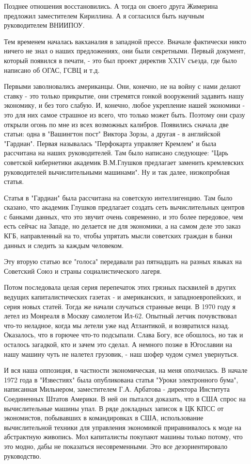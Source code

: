 \documentclass{article}
\begin{document}
Позднее отношения восстановились. А тогда он своего друга Жимерина предложил
заместителем Кириллина. А я согласился быть научным руководителем ВНИИПОУ.

Тем временем началась вакханалия в западной прессе. Вначале фактически никто
ничего не знал о наших предложениях, они были секретными. Первый документ,
который появился в печати, - это был проект директив XXIV съезда, где было
написано об ОГАС, ГСВЦ и т.д.

Первыми заволновались американцы. Они, конечно, не на войну с нами делают ставку
- это только прикрытие, они стремятся гонкой вооружений задавить нашу экономику,
и без того слабую. И, конечно, любое укрепление нашей экономики - это для них
самое страшное из всего, что только может быть. Поэтому они сразу открыли огонь
по мне из всех возможных калибров. Появились сначала две статьи: одна в
"Вашингтон пост" Виктора Зорзы, а другая - в английской "Гардиан". Первая
называлась "Перфокарта управляет Кремлем" и была рассчитана на наших
руководителей. Там было написано следующее: "Царь советской кибернетики академик
В.М.Глушков предлагает заменить кремлевских руководителей вычислительными
машинами". Ну и так далее, низкопробная статья.

Статья в "Гардиан" была рассчитана на советскую интеллигенцию. Там было сказано,
что академик Глушков предлагает создать сеть вычислительных центров с банками
данных, что это звучит очень современно, и это более передовое, чем есть сейчас
на Западе, но делается не для экономики, а на самом деле это заказ КГБ,
направленный на то, чтобы упрятать мысли советских граждан в банки данных и
следить за каждым человеком.

Эту вторую статью все "голоса" передавали раз пятнадцать на разных языках на
Советский Союз и страны социалистического лагеря.

Потом последовала целая серия перепечаток этих грязных пасквилей в других
ведущих капиталистических газетах - и американских, и западноевропейских, и
серия новых статей. Тогда же начали случаться странные вещи. В 1970 году я летел
из Монреаля в Москву самолетом Ил-62. Опытный летчик почувствовал что-то
неладное, когда мы летели уже над Атлантикой, и возвратился назад. Оказалось,
что в горючее что-то подсыпали. Слава Богу, все обошлось, но так и осталось
загадкой, кто и зачем это сделал. А немного позже в Югославии на нашу машину
чуть не налетел грузовик, - наш шофер чудом сумел увернуться.

И вся наша оппозиция, в частности экономическая, на меня ополчилась. В начале
1972 года в "Известиях" была опубликована статья "Уроки электронного бума",
написанная Мильнером, заместителем Г.А. Арбатова - директора Института
Соединенных Штатов Америки. В ней он пытался доказать, что в США спрос на
вычислительные машины упал. В ряде докладных записок в ЦК КПСС от экономистов,
побывавших в командировках в США, использование вычислительной техники для
управления экономикой приравнивалось к моде на абстрактную живопись. Мол
капиталисты покупают машины только потому, что это модно, дабы не показаться
несовременными. Это все дезориентировало руководство.
\end{document}
